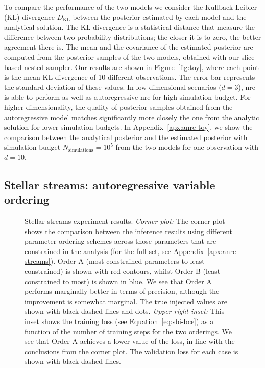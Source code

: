 To compare the performance of the two models we consider the Kullback-Leibler (KL) divergence $D_\mathrm{KL}$ between the posterior estimated by each model and the analytical solution. The KL divergence is a statistical distance that measure the difference between two probability distributions; the closer it is to zero, the better agreement there is. The mean and the covariance of the estimated posterior are computed from the posterior samples of the two models, obtained with our slice-based nested sampler. 
Our results are shown in Figure~\ref{fig:toy}, where each point is the mean KL divergence of 10 different observations. The error bar represents the standard deviation of these values. In low-dimensional scenarios ($d=3$), \gls*{nre} is able to perform as well as autoregressive \gls*{nre} for high simulation budget. For higher-dimensionality, the quality of posterior samples obtained from the autoregressive model matches significantly more closely the one from the analytic solution for lower simulation budgets. In Appendix~\ref{apx:anre-toy}, we show the comparison between the analytical posterior and the estimated posterior with simulation budget $N_\mathrm{simulations} = 10^{5}$ from the two models for one observation with $d=10$.

\subsection{Stellar streams: autoregressive variable ordering} \label{subsec:anre-stream}

\begin{figure}
    \centering
    \caption{Stellar streams experiment results. \emph{Corner plot:} The corner plot shows the comparison between the inference results using different parameter ordering schemes across those parameters that are constrained in the analysis (for the full set, see Appendix~\ref{apx:anre-streams}). Order A (most constrained parameters to least constrained) is shown with red contours, whilst Order B (least constrained to most) is shown in blue. We see that Order A performs marginally better in terms of precision, although the improvement is somewhat marginal. The true injected values are shown with black dashed lines and dots. \emph{Upper right inset:} This inset shows the training loss (see Equation~\eqref{eq:sbi-bce}) as a function of the number of training steps for the two orderings. We see that Order A achieves a lower value of the loss, in line with the conclusions from the corner plot. The validation loss for each case is shown with black dashed lines.}
    \label{fig:streams_loss}
\end{figure}

